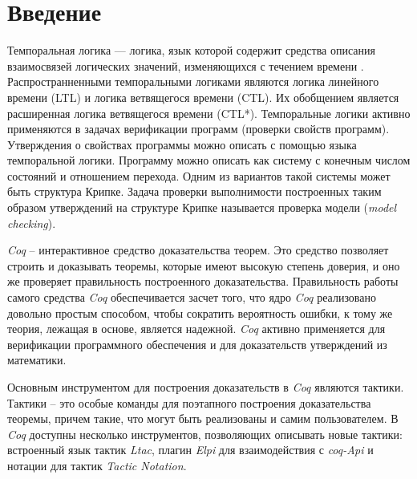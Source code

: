 \documentclass[12pt]{article}
\begin{document}
  \nirPutTitleContents
  
\section{Введение}


Темпоральная логика — логика, язык которой содержит средства описания взаимосвязей логических значений, изменяющихся с течением времени \cite{Clark}. Распространненными темпоральными логиками являются логика линейного времени (LTL) и логика ветвящегося времени (CTL). Их обобщением является расширенная логика ветвящегося времени (CTL*). Темпоральные логики активно применяются в задачах верификации программ (проверки свойств программ). Утверждения о свойствах программы можно описать с помощью языка темпоральной логики. 
Программу можно описать как систему с конечным числом состояний и отношением перехода. Одним из вариантов такой системы может быть структура Крипке. Задача проверки выполнимости построенных таким образом утверждений на структуре Крипке называется проверка модели (\textit{model checking}).

\textit{Coq} -- интерактивное средство доказательства теорем. Это средство позволяет строить и доказывать теоремы, которые имеют высокую степень доверия, и оно же проверяет правильность построенного доказательства. 
Правильность работы самого средства \textit{Coq} обеспечивается засчет того, что ядро \textit{Coq} реализовано довольно простым способом, чтобы сократить вероятность ошибки, к тому же теория, лежащая в основе, является надежной. 
\textit{Coq} активно применяется для верификации программного обеспечения \cite{CompCert} \cite{SoftwareFoundations6} и для доказательств утверждений из математики\cite{mathcomp}. 

Основным инструментом для построения доказательств в \textit{Coq} являются тактики. Тактики -- это особые команды для поэтапного построения доказательства теоремы, причем такие, что могут быть реализованы и самим пользователем.
В \textit{Coq} доступны несколько инструментов, позволяющих описывать новые тактики: встроенный язык тактик \textit{Ltac}, плагин \textit{Elpi} для взаимодействия с \textit{coq-Api} и нотации для тактик \textit{Tactic Notation}. 
\end{document}
